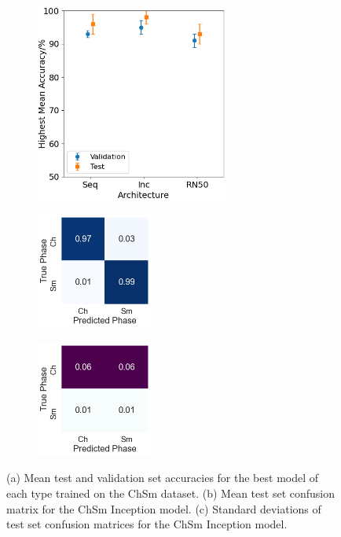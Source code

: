\documentclass[12pt]{article}
\begin{document}
\begin{figure}[!h]
\centering
\begin{subfigure}{0.4\textwidth}
	\centering
	\includegraphics[width=2.5in]{images/Graphs/ChSm.png}
	\caption{}
	\label{chsm:graph}
\end{subfigure}%
\begin{subfigure}{0.25\textwidth}
	\centering
	\includegraphics[width=1.5in]{images/ConMats/ChSm_mean.png}
	\caption{}
	\label{chsm:mean}
\end{subfigure}%
\begin{subfigure}{0.25\textwidth}
	\centering
	\includegraphics[width=1.5in]{images/ConMats/ChSm_std.png}
	\caption{}
	\label{chsm:std}
\end{subfigure}%
\caption{(a) Mean test and validation set accuracies for the best model of each type trained on the ChSm dataset. (b) Mean test set confusion matrix for the ChSm Inception model. (c) Standard deviations of test set confusion matrices for the ChSm Inception model.}
\label{chsm:chsm}
\end{figure}
\end{document}
